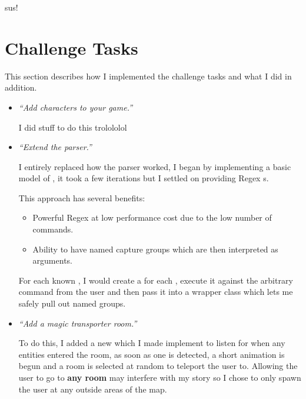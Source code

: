\documentclass{article}
\begin{document}
\begin{multicols}{2}
\begin{itemize}[leftmargin=*]
                    sus!
            \end{itemize}

        \section{Challenge Tasks}

            This section describes how I implemented the challenge tasks and what I did in addition.

            \begin{itemize}[leftmargin=*]
                \item \textit{``Add characters to your game.''}
                
                    I did stuff to do this trolololol

                \item \textit{``Extend the parser.''}
                
                    I entirely replaced how the parser worked, I began by implementing a basic model of , it took a few iterations but I settled on providing Regex s.

                    This approach has several benefits:

                    \begin{itemize}
                        \item Powerful Regex at low performance cost due to the low number of commands.
                        \item Ability to have named capture groups which are then interpreted as arguments.
                    \end{itemize}

                    For each known , I would create a  for each , execute it against the arbitrary command from the user and then pass it into a wrapper class  which lets me safely pull out named groups.
                
                \item \textit{``Add a magic transporter room.''}
                
                    To do this, I added a new  which I made implement  to listen for when any entities entered the room, as soon as one is detected, a short animation is begun and a room is selected at random to teleport the user to. Allowing the user to go to \textbf{any room} may interfere with my story so I chose to only spawn the user at any outside areas of the map.
                

\end{itemize}
\end{multicols}
\end{document}
